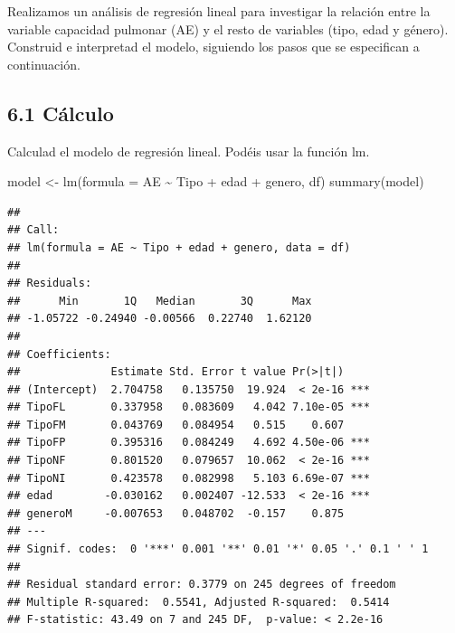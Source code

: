 \documentclass[
]{article}
\newenvironment{Shaded}{\begin{snugshade}}{\end{snugshade}}
\newcommand{\AttributeTok}[1]{\textcolor[rgb]{0.77,0.63,0.00}{#1}}
\newcommand{\FunctionTok}[1]{\textcolor[rgb]{0.00,0.00,0.00}{#1}}
\newcommand{\NormalTok}[1]{#1}
\newcommand{\OtherTok}[1]{\textcolor[rgb]{0.56,0.35,0.01}{#1}}
\newcommand{\SpecialCharTok}[1]{\textcolor[rgb]{0.00,0.00,0.00}{#1}}
\begin{document}
\vspace{0.3cm}

Realizamos un análisis de regresión lineal para investigar la relación
entre la variable capacidad pulmonar (AE) y el resto de variables (tipo,
edad y género). Construid e interpretad el modelo, siguiendo los pasos
que se especifican a continuación.

\vspace{0.3cm}

\hypertarget{cuxe1lculo}{%
\subsection{6.1 Cálculo}\label{cuxe1lculo}}

Calculad el modelo de regresión lineal. Podéis usar la función lm.

\vspace{0.3cm}

\begin{Shaded}
\begin{Highlighting}[]
\NormalTok{model }\OtherTok{\textless{}{-}} \FunctionTok{lm}\NormalTok{(}\AttributeTok{formula =}\NormalTok{ AE }\SpecialCharTok{\textasciitilde{}}\NormalTok{ Tipo }\SpecialCharTok{+}\NormalTok{ edad }\SpecialCharTok{+}\NormalTok{ genero, df)}
\FunctionTok{summary}\NormalTok{(model)}
\end{Highlighting}
\end{Shaded}

\begin{verbatim}
## 
## Call:
## lm(formula = AE ~ Tipo + edad + genero, data = df)
## 
## Residuals:
##      Min       1Q   Median       3Q      Max 
## -1.05722 -0.24940 -0.00566  0.22740  1.62120 
## 
## Coefficients:
##              Estimate Std. Error t value Pr(>|t|)    
## (Intercept)  2.704758   0.135750  19.924  < 2e-16 ***
## TipoFL       0.337958   0.083609   4.042 7.10e-05 ***
## TipoFM       0.043769   0.084954   0.515    0.607    
## TipoFP       0.395316   0.084249   4.692 4.50e-06 ***
## TipoNF       0.801520   0.079657  10.062  < 2e-16 ***
## TipoNI       0.423578   0.082998   5.103 6.69e-07 ***
## edad        -0.030162   0.002407 -12.533  < 2e-16 ***
## generoM     -0.007653   0.048702  -0.157    0.875    
## ---
## Signif. codes:  0 '***' 0.001 '**' 0.01 '*' 0.05 '.' 0.1 ' ' 1
## 
## Residual standard error: 0.3779 on 245 degrees of freedom
## Multiple R-squared:  0.5541, Adjusted R-squared:  0.5414 
## F-statistic: 43.49 on 7 and 245 DF,  p-value: < 2.2e-16
\end{verbatim}
\end{document}
